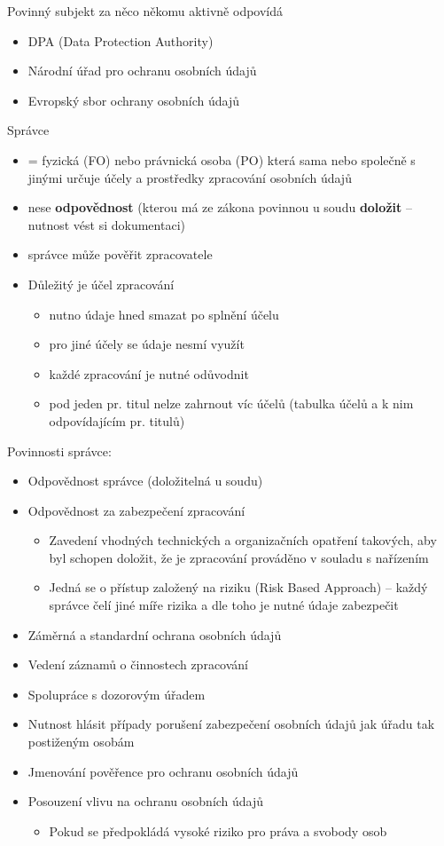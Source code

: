 \documentclass{article}
\begin{document}
Povinný subjekt za něco někomu aktivně odpovídá
\begin{itemize}
    \item DPA (Data Protection Authority)
    \item Národní úřad pro ochranu osobních údajů
    \item Evropský sbor ochrany osobních údajů
\end{itemize}
Správce
\begin{itemize}
    \item = fyzická (FO) nebo právnická osoba (PO) která sama nebo společně s jinými určuje účely a prostředky zpracování osobních údajů
    \item nese \textbf{odpovědnost} (kterou má ze zákona povinnou u soudu \textbf{doložit} -- nutnost vést si dokumentaci)
    \item správce může pověřit zpracovatele
    \item Důležitý je účel zpracování
    \begin{itemize}
        \item nutno údaje hned smazat po splnění účelu
        \item pro jiné účely se údaje nesmí využít
        \item každé zpracování je nutné odůvodnit
        \item pod jeden pr. titul nelze zahrnout víc účelů (tabulka účelů a k nim odpovídajícím pr. titulů)
    \end{itemize}
\end{itemize}
Povinnosti správce:
\begin{itemize}
    \item Odpovědnost správce (doložitelná u soudu)
    \item Odpovědnost za zabezpečení zpracování
    \begin{itemize}
        \item Zavedení vhodných technických a organizačních opatření takových, aby byl schopen doložit, že je zpracování prováděno v souladu s nařízením
        \item Jedná se o přístup založený na riziku (Risk Based Approach) -- každý správce čelí jiné míře rizika a dle toho je nutné údaje zabezpečit
    \end{itemize}
    \item Záměrná a standardní ochrana osobních údajů
    \item Vedení záznamů o činnostech zpracování
    \item Spolupráce s dozorovým úřadem
    \item Nutnost hlásit případy porušení zabezpečení osobních údajů jak úřadu tak postiženým osobám
    \item Jmenování pověřence pro ochranu osobních údajů
    \item Posouzení vlivu na ochranu osobních údajů
    \begin{itemize}
        \item Pokud se předpokládá vysoké riziko pro práva a svobody osob
    \end{itemize}
\end{itemize}
\end{document}
